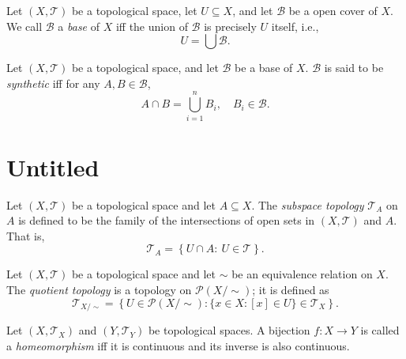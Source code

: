 \begin{definition}
	[basis]
	\label{def: basis}
	Let $(X, \mathcal T)$ be a topological space, let $U \subseteq X$, and let $\mathcal B$ be a open cover of $X$. We call $\mathcal B$ a \textit{base} of $X$ iff the union of $\mathcal B$ is precisely $U$ itself, i.e.,
	$$
	U = \bigcup \mathcal B.
	$$
\end{definition}


\begin{definition}
	\label{def: synthetic basis}
	Let $(X, \mathcal T)$ be a topological space, and let $\mathcal B$ be a base of $X$. $\mathcal B$ is said to be \textit{synthetic} iff for any $A, B \in \mathcal B$,
	$$
	A \cap B = \bigcup_{i = 1}^{n} B_i, \quad B_i \in \mathcal B.
	$$
\end{definition}


\section{Untitled}


\begin{definition}
	\label{def: subspace topology}
	Let $(X, \mathcal T)$ be a topological space and let $A \subseteq X$. The \textit{subspace topology} $\mathcal T_A$ on $A$ is defined to be the family of the intersections of open sets in $(X, \mathcal T)$ and $A$. That is,
	$$
	\mathcal T_A = \left\{ U \cap A : \ U \in \mathcal T \right\}.
	$$
\end{definition}


\begin{definition}
	\label{def: quotient topology}
	Let $(X, \mathcal T)$ be a topological space and let $\sim$ be an equivalence relation on $X$. The \textit{quotient topology} is a topology on $\mathcal P(X/ \sim)$; it is defined as
	$$
	\mathcal T_{X / \sim} = \left\{ U \in \mathcal P(X/\sim) : \{ x \in X: [x] \in U \} \in \mathcal T_X \right\}.
	$$
\end{definition}


\begin{definition}
	[homeomorphisms]
	\label{def: homomorphisms}
	Let $(X, \mathcal T_X)$ and $(Y, \mathcal T_Y)$ be topological spaces. A bijection $f: X \to Y$ is called a \textit{homeomorphism} iff it is continuous and its inverse is also continuous.
\end{definition}


